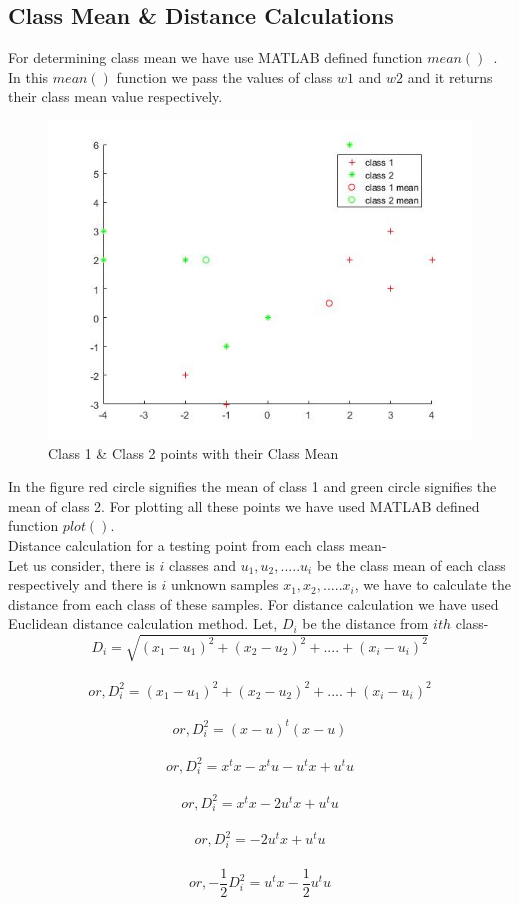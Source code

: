 \subsection{Class Mean \& Distance Calculations}
For determining class mean we have use MATLAB defined function $mean()$~\cite{b1}. In this $mean()$ function we pass the values of class $w1$ and $w2$ and it returns their class mean value respectively.
\begin{figure}[ht]
\begin{minipage}[c]{\linewidth}
\includegraphics[height=.9\linewidth,width=\linewidth]{classmean.jpg}
\caption{Class 1 \& Class 2 points with their Class Mean}
\end{minipage}
\end{figure}
In the figure red circle signifies the mean of class 1 and green circle signifies the mean of class 2. For plotting all these points we have used MATLAB defined function $plot()$.~\cite{b1}
\\
Distance calculation for a testing point from each class mean-\\
Let us consider, there is $i$ classes and $u_{1},u_{2},.....u_{i}$ be the class mean of each class respectively and there is $i$ unknown samples $x_{1},x_{2},.....x_{i}$, we have to calculate the distance from each class of these samples. For distance calculation we have used Euclidean distance calculation method.
Let, $D_{i}$ be the distance from $ith$ class-\\
\[D_{i}=\sqrt{\left ( x_{1}-u_{1} \right )^2+\left ( x_{2}-u_{2} \right )^2+....+\left ( x_{i}-u_{i} \right )^2}\]\\
\[or,D_{i}^2={\left ( x_{1}-u_{1} \right )^2+\left ( x_{2}-u_{2} \right )^2+....+\left ( x_{i}-u_{i} \right )^2}\]\\
\[or,D_{i}^2={\left ( x - u \right )^t\left ( x - u \right )}\]\\
\[or,D_{i}^2={x^t x-x^t u-u^t x+u^t u}\]\\
\[or,D_{i}^2={x^t x-2u^t x+u^t u}\]\\
\[or,D_{i}^2={-2u^t x+u^t u}\]\\
\[or,-\frac{1}{2}D_{i}^2={u^t x-\frac{1}{2}u^t u} \label{eq:distance} \tag{1}\]

